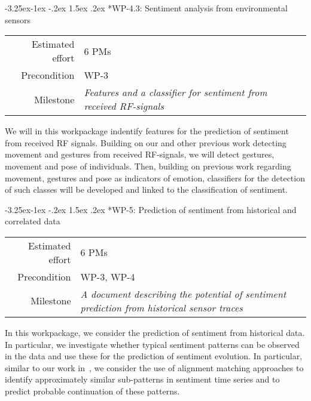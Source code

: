 \documentclass[12pt]{article}
\makeatletter
\renewcommand\paragraph{\@startsection{paragraph}{4}{\z@}%
  {-3.25ex\@plus -1ex \@minus -.2ex}%
  {1.5ex \@plus .2ex}%
  {\normalfont\normalsize\bfseries}}
\makeatother
\begin{document}
\paragraph*{WP-4.3: Sentiment analysis from environmental sensors}
\begin{tabular}{rl}
 Estimated effort& 6 PMs\\
 Precondition & WP-3\\
 Milestone & \begin{minipage}[t]{12.2cm}
\textit{Features and a classifier for sentiment from received RF-signals}\vspace{.2cm}
             \end{minipage}
\end{tabular}

\noindent
We will in this workpackage indentify features for the prediction of sentiment from received RF signals. 
Building on our and other previous work detecting movement and gestures from received RF-signals, we will detect gestures, movement and pose of individuals. 
Then, building on previous work regarding movement, gestures and pose as indicators of emotion, classifiers for the detection of such classes will be developed and linked to the classification of sentiment. 

\paragraph*{WP-5: Prediction of sentiment from historical and correlated data}
\begin{tabular}{rl}
 Estimated effort& 6 PMs\\
 Precondition & WP-3, WP-4\\
 Milestone & \begin{minipage}[t]{12.2cm}
\textit{A document describing the potential of sentiment prediction from historical sensor traces}\vspace{.2cm}
             \end{minipage}
\end{tabular}

\noindent
In this workpackage, we consider the prediction of sentiment from historical data. 
In particular, we investigate whether typical sentiment patterns can be observed in the data and use these for the prediction of sentiment evolution.
In particular, similar to our work in~\cite{4026,4027}, we consider the use of alignment matching approaches to identify approximately similar sub-patterns in sentiment time series and to predict probable continuation of these patterns.
\end{document}
